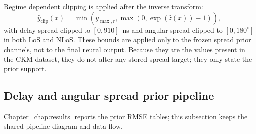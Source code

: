 Regime dependent clipping is applied after the inverse transform:
\begin{equation}
\hat y_{\mathrm{clip}}(x)
=
\min\!\left(
y_{\max,r},
\max\!\left(0,\exp(\hat z(x))-1\right)
\right),
\label{eq:spread_clip}
\end{equation}
with delay spread clipped to $[0, 910]$~ns and angular spread clipped to
$[0, 180^\circ]$ in both LoS and NLoS. These bounds are applied only to the
frozen spread prior channels, not to the final neural output. Because they are
the values present in the CKM dataset, they do not alter any stored spread
target; they only state the prior support.

\subsection{Delay and angular spread prior pipeline}

Chapter~\ref{chap:results} reports the prior RMSE tables; this subsection keeps
the shared pipeline diagram and data flow.

